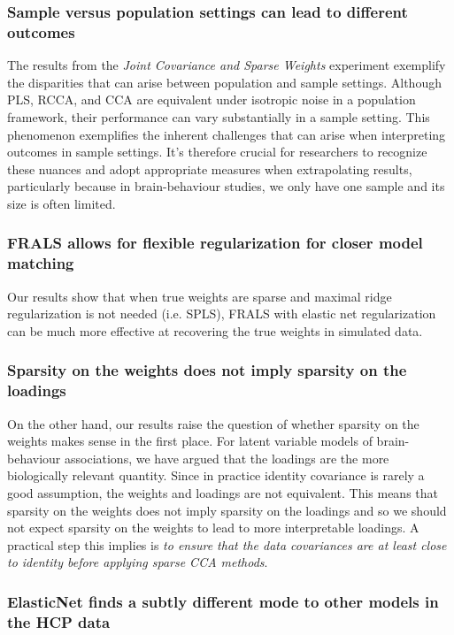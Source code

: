 \subsubsection{Sample versus population settings can lead to different outcomes}

The results from the \textit{Joint Covariance and Sparse Weights} experiment exemplify the disparities that can arise between population and sample settings.
Although PLS, RCCA, and CCA are equivalent under isotropic noise in a population framework, their performance can vary substantially in a sample setting.
This phenomenon exemplifies the inherent challenges that can arise when interpreting outcomes in sample settings.
It's therefore crucial for researchers to recognize these nuances and adopt appropriate measures when extrapolating results, particularly because in brain-behaviour studies, we only have one sample and its size is often limited.

\subsubsection{FRALS allows for flexible regularization for closer model matching}

Our results show that when true weights are sparse and maximal ridge regularization is not needed (i.e. SPLS), FRALS with elastic net regularization can be much more effective at recovering the true weights in simulated data.

\subsubsection{Sparsity on the weights does not imply sparsity on the loadings}

On the other hand, our results raise the question of whether sparsity on the weights makes sense in the first place.
For latent variable models of brain-behaviour associations, we have argued that the loadings are the more biologically relevant quantity.
Since in practice identity covariance is rarely a good assumption, the weights and loadings are not equivalent.
This means that sparsity on the weights does not imply sparsity on the loadings and so we should not expect sparsity on the weights to lead to more interpretable loadings.
A practical step this implies is \textit{to ensure that the data covariances are at least close to identity before applying sparse CCA methods}.

\subsubsection{ElasticNet finds a subtly different mode to other models in the HCP data}

